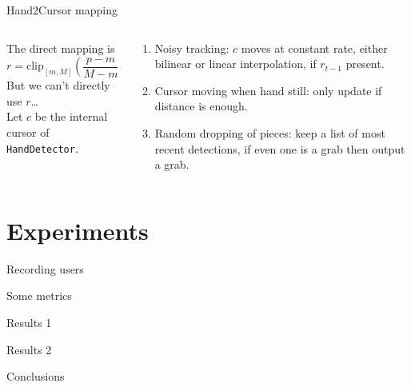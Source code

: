 \documentclass[english]{beamer}
\begin{document}
\begin{frame}{Hand2Cursor mapping}
    \begin{columns}
        \begin{column}{.5\textwidth}
            The direct mapping is
            \begin{equation}
                r = \mathrm{clip}_{[m,M]}(\frac{p - m}{M - m}).
            \end{equation}
            But we can't directly use $r$\dots\\
            Let $c$ be the internal cursor of \texttt{HandDetector}.
        \end{column}
        \begin{column}{.5\textwidth}
            \begin{enumerate}
                \item Noisy tracking: $c$ moves at constant rate, either bilinear or linear interpolation, if $r_{t-1}$ present.
                \item Cursor moving when hand still: only update if distance is enough.
                \item Random dropping of pieces: keep a list of most recent detections, if even one is a grab then output a grab.
            \end{enumerate}
        \end{column}
    \end{columns}
\end{frame}


\section{Experiments}
\begin{frame}{Recording users}
\end{frame}

\begin{frame}{Some metrics}
\end{frame}

\begin{frame}{Results 1}
\end{frame}

\begin{frame}{Results 2}
\end{frame}

\begin{frame}{Conclusions}
\end{frame}
\end{document}
